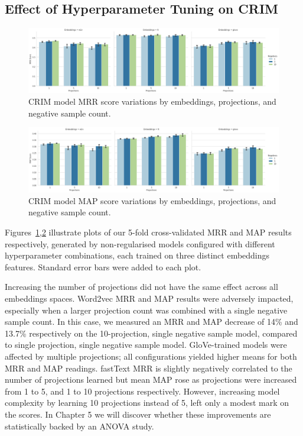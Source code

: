 \subsection{Effect of Hyperparameter Tuning on CRIM} \label{hyper_effect_CRIM}

\begin{figure}[ht!] 
  \centering
  \includegraphics[width=1.\linewidth]{images/CRIM_MRR_score_projection_and_negative_sample.png}
  \caption{CRIM model \ac{MRR} score variations by embeddings, projections, and negative sample count.}
  \label{fig:crim_hyper_mrr}
\end{figure}
\begin{figure}[ht!] 
  \centering
  \includegraphics[width=1.\linewidth]{images/CRIM_MAP_score_projection_and_negative_sample.png}
  \caption{CRIM model \ac{MAP} score variations by embeddings, projections, and negative sample count.}
  \label{fig:crim_hyper_map}
\end{figure}
Figures~\ref{fig:crim_hyper_mrr},\ref{fig:crim_hyper_map} illustrate plots of our 5-fold cross-validated \ac{MRR} and \ac{MAP} results respectively, generated by non-regularised models configured with different hyperparameter combinations, each trained on three distinct embeddings features.  Standard error bars were added to each plot.  

Increasing the number of projections did not have the same effect across all embeddings spaces.  Word2vec \ac{MRR} and \ac{MAP} results were adversely impacted, especially when a larger projection count was combined with a single negative sample count.  In this case, we measured an MRR and MAP decrease of 14\% and 13.7\% respectively on the 10-projection, single negative sample model, compared to single projection, single negative sample model.  GloVe-trained models were affected by multiple projections; all configurations yielded higher means for both \ac{MRR} and \ac{MAP} readings.  fastText \ac{MRR} is slightly negatively correlated to the number of projections learned but mean \ac{MAP} rose as projections were increased from 1 to 5, and 1 to 10 projections respectively.  However, increasing model complexity by learning 10 projections instead of 5, left only a modest mark on the scores.  In Chapter 5 we will discover whether these improvements are statistically backed by an \ac{ANOVA} study.

